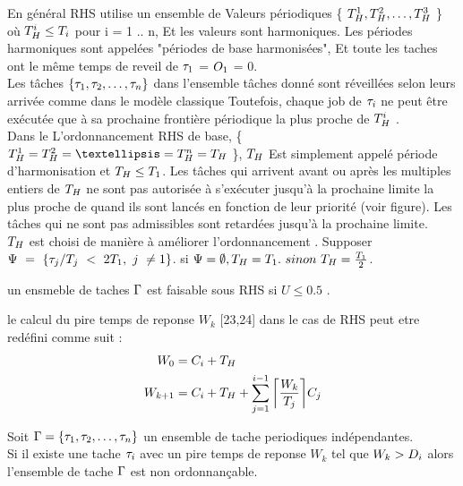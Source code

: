 En général RHS utilise un ensemble de Valeurs périodiques \{ $T_{H}^1,T_{H}^2,\dots ,T_{H}^3$ \} où $T_{H}^i \leq T_{i}$ pour i = 1 .. n, Et les valeurs sont harmoniques. Les périodes harmoniques sont appelées "périodes de base harmonisées", Et toute les taches ont le même temps de reveil de $\tau_{1}$ = $O_1$ = 0.
\\ Les tâches $\{\tau_{1}, \tau_{2}, \dots, \tau_{n} \}$ dans l’ensemble tâches donné sont réveillées selon leurs arrivée comme dans le modèle classique Toutefois, chaque job de $\tau_{i}$ ne peut être exécutée que à sa prochaine frontière périodique la plus proche de $T_{H}^i$ \cite{Rowe10}.
\\ \indent Dans le L’ordonnancement RHS de base, \{ $\periode{H}^1 = \periode{H}^2 = … = \periode{H}^n = \periode{H}$ \}, $T_{H}$ Est simplement appelé période d'harmonisation et $T_{H} \leq T_{1}$. Les tâches qui arrivent avant ou après les multiples entiers de $T_{H}$ ne sont pas autorisée à s'exécuter jusqu'à la prochaine limite la plus proche de quand ils sont lancés en fonction de leur priorité (voir figure). Les tâches qui ne sont pas admissibles sont retardées jusqu'à la prochaine limite.
\\ \indent $T_{H}$ est choisi de manière à améliorer l'ordonnancement \cite{Rowe10}. Supposer $\Psi~=~\{ \tau_{j} / T_{j}~<~2T_{1},~j~\neq 1\}$. si $\Psi = \emptyset, T_{H} = T_{1}.~sinon~T_{H} = \frac{T_{1}}{2}$. 

\begin{theoreme}
un ensmeble de taches $\Gamma$ est faisable sous RHS si $U \leq 0.5$ .
\end{theoreme}

\begin{theoreme}
le calcul du pire temps de reponse $W_k$ [23,24] dans le cas de RHS peut etre redéfini comme suit :
\\ 
\begin{align}
W_0 & = C_{i} + T_{H} 
\\ W_{k+1} & = C_{i} + T_{H} + \sum_{j = 1}^{i-1} \bigg \lceil \frac{W_k}{T_{j}}\bigg \rceil C_{j}
\end{align}
\end{theoreme}

\begin{theoreme}
Soit $\Gamma = \{\tau_{1}, \tau_{2}, \dots, \tau_{n} \}$ un ensemble de tache periodiques indépendantes. \\
Si il existe une tache $\tau_{i}$ avec un pire temps de reponse $W_k$ tel que $W_k > D_{i}$ alors l'ensemble de tache $\Gamma$ est non ordonnançable.
\end{theoreme}
